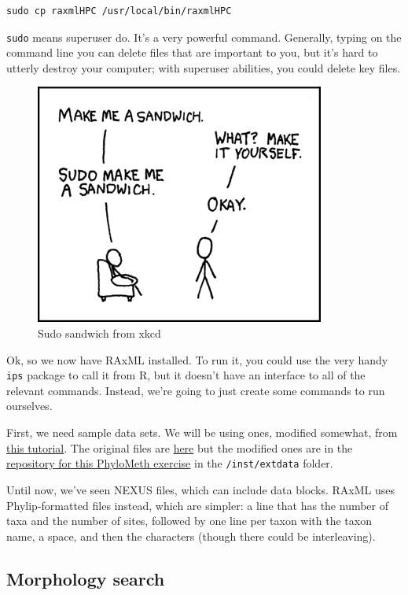 \documentclass[
]{article}
\begin{document}
\begin{verbatim}
sudo cp raxmlHPC /usr/local/bin/raxmlHPC
\end{verbatim}

\texttt{sudo} means superuser do. It's a very powerful command. Generally, typing on the command line you can delete files that are important to you, but it's hard to utterly destroy your computer; with superuser abilities, you could delete key files.

\begin{figure}
\centering
\includegraphics{images/sandwich.png}
\caption{Sudo sandwich from xkcd}
\end{figure}

Ok, so we now have RAxML installed. To run it, you could use the very handy \texttt{ips} package to call it from R, but it doesn't have an interface to all of the relevant commands. Instead, we're going to just create some commands to run ourselves.

First, we need sample data sets. We will be using ones, modified somewhat, from \href{http://sco.h-its.org/exelixis/web/software/raxml/hands_on.html}{this tutorial}. The original files are \href{http://sco.h-its.org/exelixis/resource/download/hands-on/Hands-On.tar.bz2}{here} but the modified ones are in the \href{https://github.com/PhyloMeth/LikelihoodTrees}{repository for this PhyloMeth exercise} in the \texttt{/inst/extdata} folder.

Until now, we've seen NEXUS files, which can include data blocks. RAxML uses Phylip-formatted files instead, which are simpler: a line that has the number of taxa and the number of sites, followed by one line per taxon with the taxon name, a space, and then the characters (though there could be interleaving).

\hypertarget{morphology-search}{%
\subsection{Morphology search}\label{morphology-search}}
\end{document}
